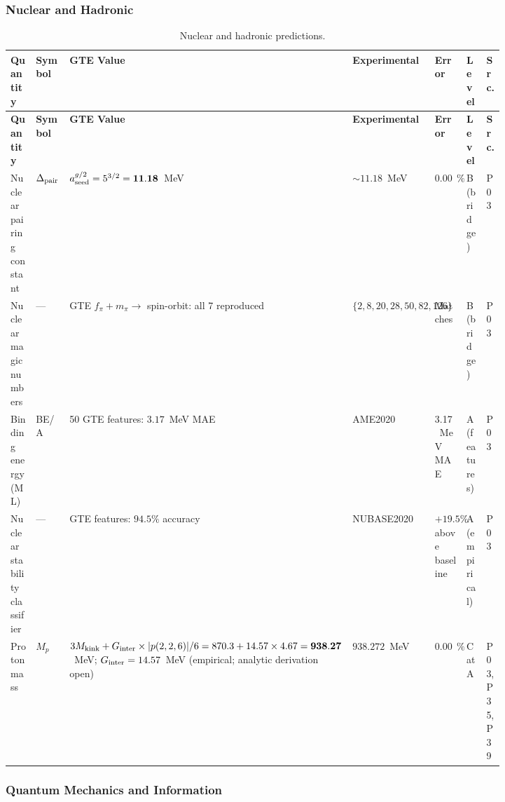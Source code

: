 \subsubsection{Nuclear and Hadronic}
\label{sec:mi-nuclear}

\begingroup\footnotesize\renewcommand{\arraystretch}{1.2}
\begin{longtable}{@{}P{0.15\linewidth}P{0.08\linewidth}P{0.18\linewidth}P{0.20\linewidth}P{0.08\linewidth}P{0.07\linewidth}P{0.06\linewidth}@{}}
\caption{Nuclear and hadronic predictions.}
\label{tab:mi-nuclear}\\
\toprule
\textbf{Quantity} & \textbf{Symbol} & \textbf{GTE Value} &
  \textbf{Experimental} & \textbf{Error} & \textbf{Level} & \textbf{Src.} \\
\midrule
\endfirsthead
\midrule
\textbf{Quantity} & \textbf{Symbol} & \textbf{GTE Value} &
  \textbf{Experimental} & \textbf{Error} & \textbf{Level} & \textbf{Src.} \\
\midrule
\endhead
\bottomrule
\endfoot
Nuclear pairing constant & $\Delta_{\rm pair}$ &
  $a_{\rm seed}^{g/2} = 5^{3/2} = \mathbf{11.18}$~MeV &
  $\sim\!11.18$~MeV & $\mathbf{0.003\%}$ & B (bridge) & P03 \\
Nuclear magic numbers & --- &
  GTE $f_\pi + m_\pi \to$ spin-orbit: all 7 reproduced &
  $\{2,8,20,28,50,82,126\}$ & Matches & B (bridge) & P03 \\
Binding energy (ML) & BE/A &
  50 GTE features: $3.17$~MeV MAE &
  AME2020 & 3.17~MeV MAE & A (features) & P03 \\
Nuclear stability classifier & --- &
  GTE features: $94.5\%$ accuracy &
  NUBASE2020 & $+19.5\%$ above baseline & A (empirical) & P03 \\
Proton mass & $M_p$ &
  $3M_{\rm kink} + G_{\rm inter}\times|p(2,2,6)|/6 = 870.3 + 14.57\times4.67 = \mathbf{938.27}$~MeV;
  $G_{\rm inter} = 14.57$~MeV (empirical; analytic derivation open) &
  $938.272$~MeV & $\mathbf{0.000\%}$ & CatA & P03, P35, P39 \\
\end{longtable}
\endgroup

\subsubsection{Quantum Mechanics and Information}
\label{sec:mi-qm}

